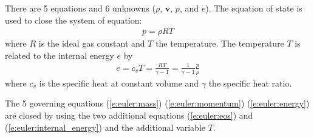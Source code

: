 \documentclass{turgon}
\begin{document}
There are 5 equations and 6 unknowns ($\rho$, $\mathbf{v}$, $p$, and $e$).
The equation of state is used to close the system of equation:
%
\begin{align}
  p = \rho RT \label{e:euler:eos}
\end{align}
where $R$ is the ideal gas constant and $T$ the temperature.
%
The temperature $T$ is related to the internal energy $e$ by
%
\begin{align}
  e = c_vT = \frac{RT}{\gamma-1} = \frac{1}{\gamma-1}\frac{p}{\rho}
  \label{e:euler:internal_energy}
\end{align}
%
where $c_v$ is the specific heat at constant volume and $\gamma$ the specific
heat ratio.

The 5 governing equations (\ref{e:euler:mass}) (\ref{e:euler:momentum})
(\ref{e:euler:energy}) are closed by using the two additional equations
(\ref{e:euler:eos}) and (\ref{e:euler:internal_energy}) and the additional
variable $T$.
\end{document}
